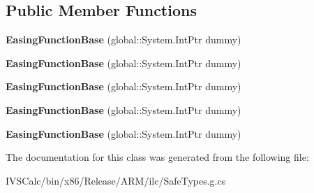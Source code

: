 \subsection*{Public Member Functions}
\begin{DoxyCompactItemize}
\item 
\mbox{\label{class_windows_1_1_u_i_1_1_xaml_1_1_media_1_1_animation_1_1_easing_function_base_a765d826846da15b26e6e5818a6bc2720}} 
{\bfseries Easing\+Function\+Base} (global\+::\+System.\+Int\+Ptr dummy)
\item 
\mbox{\label{class_windows_1_1_u_i_1_1_xaml_1_1_media_1_1_animation_1_1_easing_function_base_a765d826846da15b26e6e5818a6bc2720}} 
{\bfseries Easing\+Function\+Base} (global\+::\+System.\+Int\+Ptr dummy)
\item 
\mbox{\label{class_windows_1_1_u_i_1_1_xaml_1_1_media_1_1_animation_1_1_easing_function_base_a765d826846da15b26e6e5818a6bc2720}} 
{\bfseries Easing\+Function\+Base} (global\+::\+System.\+Int\+Ptr dummy)
\item 
\mbox{\label{class_windows_1_1_u_i_1_1_xaml_1_1_media_1_1_animation_1_1_easing_function_base_a765d826846da15b26e6e5818a6bc2720}} 
{\bfseries Easing\+Function\+Base} (global\+::\+System.\+Int\+Ptr dummy)
\item 
\mbox{\label{class_windows_1_1_u_i_1_1_xaml_1_1_media_1_1_animation_1_1_easing_function_base_a765d826846da15b26e6e5818a6bc2720}} 
{\bfseries Easing\+Function\+Base} (global\+::\+System.\+Int\+Ptr dummy)
\end{DoxyCompactItemize}


The documentation for this class was generated from the following file\+:\begin{DoxyCompactItemize}
\item 
I\+V\+S\+Calc/bin/x86/\+Release/\+A\+R\+M/ilc/Safe\+Types.\+g.\+cs\end{DoxyCompactItemize}
